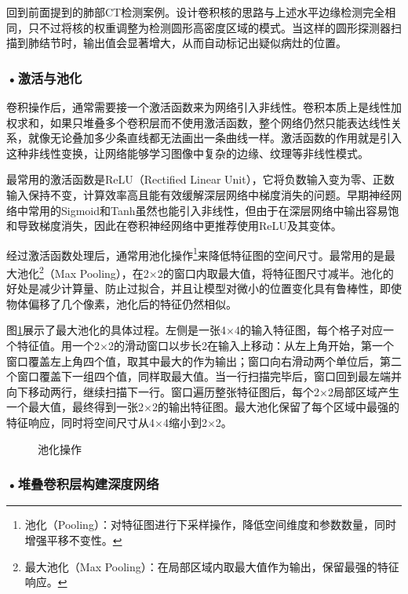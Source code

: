 回到前面提到的肺部CT检测案例。设计卷积核的思路与上述水平边缘检测完全相同，只不过将核的权重调整为检测圆形高密度区域的模式。当这样的圆形探测器扫描到肺结节时，输出值会显著增大，从而自动标记出疑似病灶的位置。

\subsubsection*{\textbf{•激活与池化}}

卷积操作后，通常需要接一个激活函数来为网络引入非线性。卷积本质上是线性加权求和，如果只堆叠多个卷积层而不使用激活函数，整个网络仍然只能表达线性关系，就像无论叠加多少条直线都无法画出一条曲线一样。激活函数的作用就是引入这种非线性变换，让网络能够学习图像中复杂的边缘、纹理等非线性模式。

最常用的激活函数是ReLU（Rectified Linear Unit），它将负数输入变为零、正数输入保持不变，计算效率高且能有效缓解深层网络中梯度消失的问题。早期神经网络中常用的Sigmoid和Tanh虽然也能引入非线性，但由于在深层网络中输出容易饱和导致梯度消失，因此在卷积神经网络中更推荐使用ReLU及其变体。

经过激活函数处理后，通常用池化操作\footnote{池化（Pooling）：对特征图进行下采样操作，降低空间维度和参数数量，同时增强平移不变性。}来降低特征图的空间尺寸。最常用的是最大池化\footnote{最大池化（Max Pooling）：在局部区域内取最大值作为输出，保留最强的特征响应。}（Max Pooling），在2$\times$2的窗口内取最大值，将特征图尺寸减半。池化的好处是减少计算量、防止过拟合，并且让模型对微小的位置变化具有鲁棒性，即使物体偏移了几个像素，池化后的特征仍然相似。

图\ref{fig:ch2_2_16}展示了最大池化的具体过程。左侧是一张4$\times$4的输入特征图，每个格子对应一个特征值。用一个2$\times$2的滑动窗口以步长2在输入上移动：从左上角开始，第一个窗口覆盖左上角四个值，取其中最大的作为输出；窗口向右滑动两个单位后，第二个窗口覆盖下一组四个值，同样取最大值。当一行扫描完毕后，窗口回到最左端并向下移动两行，继续扫描下一行。窗口遍历整张特征图后，每个2$\times$2局部区域产生一个最大值，最终得到一张2$\times$2的输出特征图。最大池化保留了每个区域中最强的特征响应，同时将空间尺寸从4$\times$4缩小到2$\times$2。

\begin{figure}[H]
\centering
{}
\caption{池化操作}
\label{fig:ch2_2_16}
\end{figure}

\subsubsection*{\textbf{•堆叠卷积层构建深度网络}}

